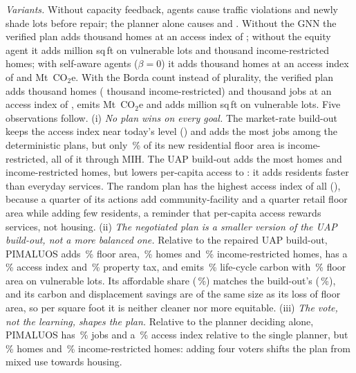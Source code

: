 \documentclass[preprint,12pt]{elsarticle}
\newcommand{\cotwo}{CO$_2$e}
\begin{document}
\emph{Variants.} Without capacity feedback, agents cause \NoCapTrafficProp{} traffic violations and newly shade \NoCapShadedProp{} lots before repair; the planner alone causes \SingleTrafficProp{} and \SingleShadedProp{}. Without the GNN the verified plan adds \NoGnnHomesKVer{} thousand homes at an access index of \NoGnnAccessVer{}; without the equity agent it adds \NoEqVulnMVer{} million sq\,ft on vulnerable lots and \NoEqAffHomesKVer{} thousand income-restricted homes; with self-aware agents ($\beta=0$) it adds \SelfAwareHomesKVer{} thousand homes at an access index of \SelfAwareAccessVer{} and \SelfAwareCarbonMtVer{} Mt~\cotwo{}. With the Borda count instead of plurality, the verified plan adds \BordaHomesKVer{} thousand homes (\BordaAffHomesKVer{} thousand income-restricted) and \BordaJobsKVer{} thousand jobs at an access index of \BordaAccessVer{}, emits \BordaCarbonMtVer{} Mt~\cotwo{} and adds \BordaVulnMVer{} million sq\,ft on vulnerable lots.
Five observations follow.
(i) \emph{No plan wins on every goal.} The market-rate build-out keeps the access index near today's level (\BoMktAccessVer{}) and adds the most jobs among the deterministic plans, but only \BoMktAffSharePctVer{}\,\% of its new residential floor area is income-restricted, all of it through MIH. The UAP build-out adds the most homes and income-restricted homes, but lowers per-capita access to \BoUapAccessVer{}: it adds residents faster than everyday services. The random plan has the highest access index of all (\RandAccessVer{}), because a quarter of its actions add community-facility and a quarter retail floor area while adding few residents, a reminder that per-capita access rewards services, not housing.
(ii) \emph{The negotiated plan is a smaller version of the UAP build-out, not a more balanced one.} Relative to the repaired UAP build-out, PIMALUOS adds \PimVsBoUapFAMPct{}\,\% floor area, \PimVsBoUapHomesKPct{}\,\% homes and \PimVsBoUapAffHomesKPct{}\,\% income-restricted homes, has a \PimVsBoUapAccessPct{}\,\% access index and \PimVsBoUapTaxMPct{}\,\% property tax, and emits \PimVsBoUapCarbonMtPct{}\,\% life-cycle carbon with \PimVsBoUapVulnMPct{}\,\% floor area on vulnerable lots. Its affordable share (\PimAffSharePctVer{}\,\%) matches the build-out's (\BoUapAffSharePctVer{}\,\%), and its carbon and displacement savings are of the same size as its loss of floor area, so per square foot it is neither cleaner nor more equitable.
(iii) \emph{The vote, not the learning, shapes the plan.} Relative to the planner deciding alone, PIMALUOS has \PimVsSingleJobsKPct{}\,\% jobs and a \PimVsSingleAccessPct{}\,\% access index relative to the single planner, but \PimVsSingleHomesKPct{}\,\% homes and \PimVsSingleAffHomesKPct{}\,\% income-restricted homes: adding four voters shifts the plan from mixed use towards housing.
\end{document}
